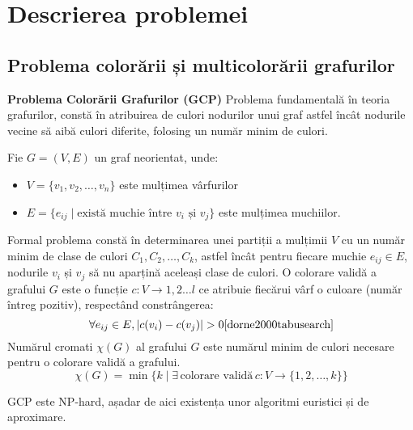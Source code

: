 
\chapter{Descrierea problemei}
 

\section{Problema colorării și multicolorării grafurilor}

{\bf Problema Colorării Grafurilor (GCP)}
     Problema fundamentală în teoria grafurilor, constă în atribuirea de culori nodurilor unui graf astfel încât nodurile vecine să aibă culori diferite, folosing un număr minim de culori. 
   
  \begin{Def}
Fie $G = (V, E)$ un graf neorientat, unde:
\begin{itemize} 
  \item $V = \{v_1, v_2, \ldots, v_n\}$ este mulțimea vârfurilor
  \item $E = \{e_{ij} \mid \text{există muchie între } v_i \text{ și } v_j\}$ este mulțimea muchiilor.
  \end{itemize} 
  Formal problema constă în determinarea unei partiții a mulțimii $V$ cu un număr minim de clase de culori $C_1,C_2, \ldots, C_k$, astfel încât pentru fiecare muchie $e_{ij} \in E$, nodurile $v_i$ și $v_j$ să nu aparțină aceleași clase de culori.\cite{Papadimitriou1982}
  O colorare validă a grafului $G$ este o funcție $c: V \rightarrow {1,2 \ldots l}$ ce atribuie fiecărui vârf o culoare (număr întreg pozitiv), respectând constrângerea: 
\begin{equation}
   \forall e_{ij} \in E, |c(v_i)-c(v_j)| > 0\cite{dorne2000tabusearch}
   \end{equation}
  Numărul cromati  $\chi(G)$ al grafului $G$ este numărul minim de culori necesare pentru o colorare validă a grafului. 
  \begin{equation}
\chi(G)=\min\{k \mid \exists\, \text{colorare validă}\, c: V \rightarrow \{1,2, \ldots, k\}\}
  \end{equation}
\end{Def}
GCP este NP-hard, așadar de aici existența unor algoritmi euristici\cite{Costa1995}\cite{Dorne1998} și de aproximare.
 


\vspace{1cm}

